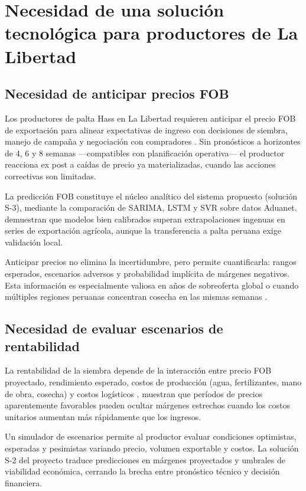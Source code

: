 \section{Necesidad de una soluci\'on tecnol\'ogica para productores de La Libertad}

\subsection{Necesidad de anticipar precios FOB}

Los productores de palta Hass en La Libertad requieren anticipar el precio FOB de exportaci\'on para alinear expectativas de ingreso con decisiones de siembra, manejo de campa\~na y negociaci\'on con compradores \citep{VitteryFlores2023, Velasquez2025}. Sin pron\'osticos a horizontes de 4, 6 y 8 semanas ---compatibles con planificaci\'on operativa--- el productor reacciona ex post a ca\'idas de precio ya materializadas, cuando las acciones correctivas son limitadas.

La predicci\'on FOB constituye el n\'ucleo anal\'itico del sistema propuesto (soluci\'on S-3), mediante la comparaci\'on de SARIMA, LSTM y SVR sobre datos Aduanet. \citet{Kurnadipare2025} demuestran que modelos bien calibrados superan extrapolaciones ingenuas en series de exportaci\'on agr\'icola, aunque la transferencia a palta peruana exige validaci\'on local.

Anticipar precios no elimina la incertidumbre, pero permite cuantificarla: rangos esperados, escenarios adversos y probabilidad impl\'icita de m\'argenes negativos. Esta informaci\'on es especialmente valiosa en a\~nos de sobreoferta global o cuando m\'ultiples regiones peruanas concentran cosecha en las mismas semanas \citep{SierraSelva2020, ComexPeru2025}.

\subsection{Necesidad de evaluar escenarios de rentabilidad}

La rentabilidad de la siembra depende de la interacci\'on entre precio FOB proyectado, rendimiento esperado, costos de producci\'on (agua, fertilizantes, mano de obra, cosecha) y costos log\'isticos \citep{Capunay2025, VargasCordova2025}. \citet{Capunay2025} muestran que per\'iodos de precios aparentemente favorables pueden ocultar m\'argenes estrechos cuando los costos unitarios aumentan m\'as r\'apidamente que los ingresos.

Un simulador de escenarios permite al productor evaluar condiciones optimistas, esperadas y pesimistas variando precio, volumen exportable y costos. La soluci\'on S-2 del proyecto traduce predicciones en m\'argenes proyectados y umbrales de viabilidad econ\'omica, cerrando la brecha entre pron\'ostico t\'ecnico y decisi\'on financiera.

